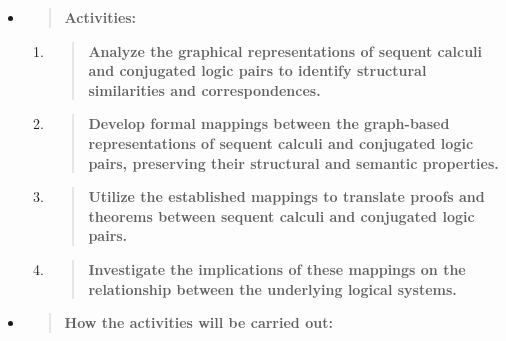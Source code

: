 \begin{itemize}
\item
  \begin{quote}
  \textbf{Activities:\\
  }
  \end{quote}

  \begin{enumerate}
  \def\labelenumi{\arabic{enumi}.}
  \item
    \begin{quote}
    \textbf{Analyze the graphical representations of sequent calculi and
    conjugated logic pairs to identify structural similarities and
    correspondences.\\
    }
    \end{quote}
  \item
    \begin{quote}
    \textbf{Develop formal mappings between the graph-based
    representations of sequent calculi and conjugated logic pairs,
    preserving their structural and semantic properties.\\
    }
    \end{quote}
  \item
    \begin{quote}
    \textbf{Utilize the established mappings to translate proofs and
    theorems between sequent calculi and conjugated logic pairs.\\
    }
    \end{quote}
  \item
    \begin{quote}
    \textbf{Investigate the implications of these mappings on the
    relationship between the underlying logical systems.\\
    }
    \end{quote}
  \end{enumerate}
\item
  \begin{quote}
  \textbf{How the activities will be carried out:\\
  }
  \end{quote}


\end{itemize}
